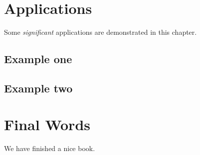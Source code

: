 \documentclass[]{book}
\begin{document}
\chapter{Applications}\label{applications}

Some \emph{significant} applications are demonstrated in this chapter.

\section{Example one}\label{example-one}

\section{Example two}\label{example-two}

\chapter{Final Words}\label{final-words}

We have finished a nice book.


\end{document}
